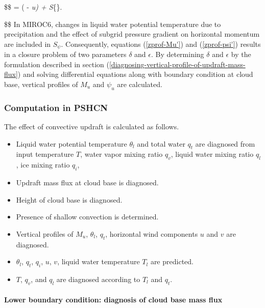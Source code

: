 \$\$  = \epsilon(\overline{\psi} - \psi\emph{u) + S}\{\psi\}. \label{zprof-psi'}

\$\$ In MIROC6, changes in liquid water potential temperature due to precipitation and the effect of subgrid pressure gradient on horizontal momentum are included in \(S_{\psi}\). Consequently,
equations (\ref{zprof-Mu'}) and (\ref{zprof-psi'}) results in a closure problem of two parameters \(\delta\) and \(\epsilon\). By determining \(\delta\) and \(\epsilon\) by
the formulation described in section (\ref{diagnosing-vertical-profile-of-updraft-mass-flux}) and solving differential equations along with boundary condition at cloud base, vertical
profiles of \(M_u\) and \(\psi_u\) are calculated.

\hypertarget{computation-in-PSHCN}{%
\subsubsection{Computation in PSHCN}\label{computation-in-PSHCN}}

The effect of convective updraft is calculated as follows.

\begin{itemize}
\item
  Liquid water potential temperature \(\theta_l\) and total water \(q_t\) are diagnosed from input temperature \(T\), water vapor mixing ratio \(q_v\), liquid water mixing ratio \(q_l\), ice mixing
  ratio \(q_i\),
\item
  Updraft mass flux at cloud base is diagnosed.
\item
  Height of cloud base is diagnosed.
\item
  Presence of shallow convection is determined.
\item
  Vertical profiles of \(M_u\), \(\theta_l\), \(q_t\), horizontal wind components \(u\) and \(v\) are diagnosed.
\item
  \(\theta_l\), \(q_t\), \(q_i\), \(u\), \(v\), liquid water temperature \(T_l\) are predicted.
\item
  \(T\), \(q_v\), and \(q_l\) are diagnosed according to \(T_l\) and \(q_t\).
\end{itemize}

\hypertarget{lower-boundary-condition}{%
\paragraph{Lower boundary condition: diagnosis of cloud base mass flux}\label{lower-boundary-condition}}

